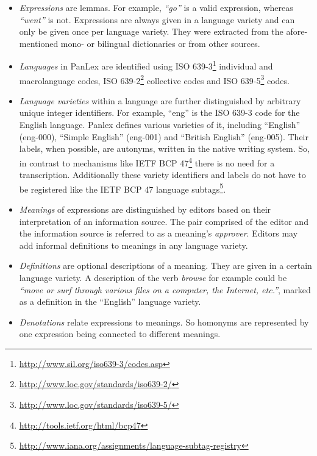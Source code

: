 \documentclass[sw]{iosart2c}
\begin{document}
\begin{itemize}
  \item \emph{Expressions} are lemmas. For example, \emph{``go''} is a valid expression, whereas \emph{``went''} is not.
  Expressions are always given in a language variety and can only be given once per language variety.
  They were extracted from the afore-mentioned mono- or bilingual dictionaries or from other sources.
  \item \emph{Languages} in PanLex are identified using ISO 639-3\footnote{\url{http://www.sil.org/iso639-3/codes.asp}} individual and macrolanguage codes, ISO 639-2\footnote{\url{http://www.loc.gov/standards/iso639-2/}} collective codes and ISO 639-5\footnote{\url{http://www.loc.gov/standards/iso639-5/}} codes.
  \item \emph {Language varieties} within a language are further distinguished by arbitrary unique integer identifiers.
  For example, ``eng'' is the ISO 639-3 code for the English language.
  Panlex defines various varieties of it, including ``English'' (eng-000), ``Simple English'' (eng-001) and ``British English'' (eng-005).
  Their labels, when possible, are autonyms, written in the native writing system.
  So, in contrast to mechanisms like IETF BCP 47\footnote{\url{http://tools.ietf.org/html/bcp47}} there is no need for a transcription. %
  Additionally these variety identifiers and labels do not have to be registered like the IETF BCP 47 language subtags\footnote{\url{http://www.iana.org/assignments/language-subtag-registry}}.
  \item \emph{Meanings} of expressions are distinguished by editors based on their
  interpretation of an information source.
  The pair comprised of the editor and the information source is referred to as a meaning's \emph{approver}.
  Editors may add informal definitions to meanings in any language variety.
  \item \emph{Definitions} are optional descriptions of a meaning.
  They are given in a certain language variety.
  A description of the verb \emph{browse} for example could be \emph{``move or surf through various files on a computer, the Internet, etc.''}, marked as a definition in the ``English'' language variety.
  \item \emph{Denotations} relate expressions to meanings.
  So homonyms are represented by one expression being connected to different meanings.

\end{itemize}
\end{document}
